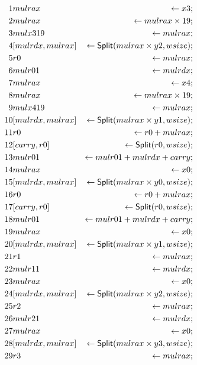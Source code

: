 
\allowdisplaybreaks[1]
\begin{align*}
1 & mulrax & \leftarrow x3; \\
2 & mulrax & \leftarrow mulrax \times 19; \\
3 & mulx319 & \leftarrow mulrax; \\
4 & \concat{mulrdx}{mulrax} & \leftarrow \dslcode{Split}(mulrax \times y2, wsize); \\
5 & r0 & \leftarrow mulrax; \\
6 & mulr01 & \leftarrow mulrdx; \\
7 & mulrax & \leftarrow x4; \\
8 & mulrax & \leftarrow mulrax \times 19; \\
9 & mulx419 & \leftarrow mulrax; \\
10 & \concat{mulrdx}{mulrax} & \leftarrow \dslcode{Split}(mulrax \times y1, wsize); \\
11 & r0 & \leftarrow r0 + mulrax; \\
12 & \concat{carry}{r0} & \leftarrow \dslcode{Split}(r0, wsize); \\
13 & mulr01 & \leftarrow mulr01 + mulrdx + carry; \\
14 & mulrax & \leftarrow x0; \\
15 & \concat{mulrdx}{mulrax} & \leftarrow \dslcode{Split}(mulrax \times y0, wsize); \\
16 & r0 & \leftarrow r0 + mulrax; \\
17 & \concat{carry}{r0} & \leftarrow \dslcode{Split}(r0, wsize); \\
18 & mulr01 & \leftarrow mulr01 + mulrdx + carry; \\
19 & mulrax & \leftarrow x0; \\
20 & \concat{mulrdx}{mulrax} & \leftarrow \dslcode{Split}(mulrax \times y1, wsize); \\
21 & r1 & \leftarrow mulrax; \\
22 & mulr11 & \leftarrow mulrdx; \\
23 & mulrax & \leftarrow x0; \\
24 & \concat{mulrdx}{mulrax} & \leftarrow \dslcode{Split}(mulrax \times y2, wsize); \\
25 & r2 & \leftarrow mulrax; \\
26 & mulr21 & \leftarrow mulrdx; \\
27 & mulrax & \leftarrow x0; \\
28 & \concat{mulrdx}{mulrax} & \leftarrow \dslcode{Split}(mulrax \times y3, wsize); \\
29 & r3 & \leftarrow mulrax; \\

\end{align*}
